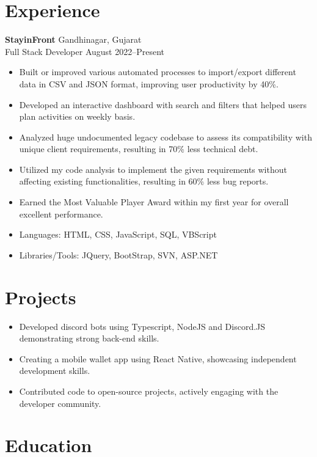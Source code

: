 \documentclass[a4paper,10pt]{article}
\begin{document}
\section{Experience}
\noindent
\textbf{StayinFront} \hfill Gandhinagar, Gujarat \\
Full Stack Developer \hfill August 2022--Present \
\begin{itemize}
    \item Built or improved various automated processes to import/export different data in CSV and JSON format, improving user productivity by 40\%.
    \item Developed an interactive dashboard with search and filters that helped users plan activities on weekly basis.
    \item Analyzed huge undocumented legacy codebase to assess its compatibility with unique client requirements, resulting in 70\% less technical debt.
    \item Utilized my code analysis to implement the given requirements without affecting existing functionalities, resulting in 60\% less bug reports.
    \item Earned the Most Valuable Player Award within my first year for overall excellent performance.
    \item Languages: HTML, CSS, JavaScript, SQL, VBScript
    \item Libraries/Tools: JQuery, BootStrap, SVN, ASP.NET
\end{itemize}

\section{Projects}
\begin{itemize}
    \item Developed discord bots using Typescript, NodeJS and Discord.JS demonstrating strong back-end skills.
    \item Creating a mobile wallet app using React Native, showcasing independent development skills.
    \item Contributed code to open-source projects, actively engaging with the developer community.
\end{itemize}

\section{Education}
\end{document}
